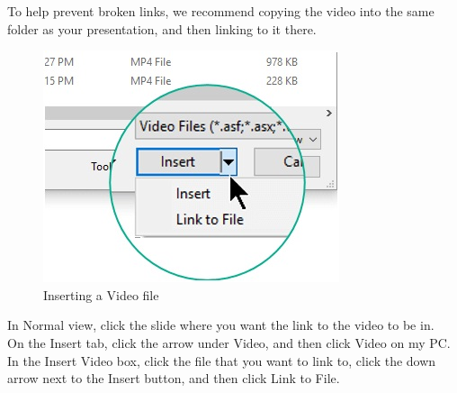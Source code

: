 \documentclass[11pt,a4paper,twoside]{article}
\begin{document}
To help prevent broken links, we recommend copying the video into the same folder as your presentation, and then linking to it there.\\
\begin{figure}[H]
\centering \includegraphics[scale=1]{Fig 32.jpg}
\caption{Inserting a Video file}
\end{figure}
In Normal view, click the slide where you want the link to the video to be in.\\
On the Insert tab, click the arrow under Video, and then click Video on my PC.\\
In the Insert Video box, click the file that you want to link to, click the down arrow next to the Insert button, and then click Link to File.
\newpage
\end{document}
